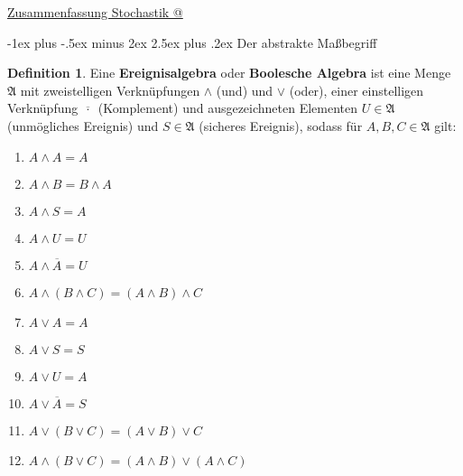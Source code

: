 \documentclass[a4paper,10pt,landscape]{article}
\makeatletter
\theoremstyle{definition}
\newtheorem*{defn}{Definition}
\theoremstyle{remark}
\newcommand*{\rom}[1]{\expandafter\@slowromancap\romannumeral #1@}
\renewcommand{\emph}[1]{\textcolor{Emph}{\bf{#1}}}
\renewcommand{\section}{\@startsection{section}{1}{0mm}%
                                {-1ex plus -.5ex minus 2ex}%
                                {2.5ex plus .2ex}%
                                {\normalfont\large\bfseries}}
\makeatother
\begin{document}
\raggedright
\footnotesize
\begin{multicols}{3}

\setlength{\premulticols}{1pt}
\setlength{\postmulticols}{1pt}
\setlength{\multicolsep}{1pt}
\setlength{\columnsep}{2pt}

\begin{center}
  \Large{\underline{Zusammenfassung Stochastik \rom{1}}} \\
\end{center}

\section{Der abstrakte Maßbegriff}


\begin{defn}
  Eine \emph{Ereignisalgebra} oder \emph{Boolesche Algebra} ist eine Menge $\mathfrak{A}$ mit zweistelligen Verknüpfungen $\wedge$ (\glqq und\grqq) und $\vee$ (\glqq oder\grqq), einer einstelligen Verknüpfung $\overline{\,\cdot\,}$ (Komplement) und ausgezeichneten Elementen $U \in \mathfrak{A}$ (unmögliches Ereignis) und $S \in \mathfrak{A}$ (sicheres Ereignis), sodass für $A, B, C \in \mathfrak{A}$ gilt:

  \begin{multicols}{2}
    \scriptsize
    \begin{enumerate}[label=\roman*.,leftmargin=2em]
      \item $A \wedge A = A$
      \item $A \wedge B = B \wedge A$
      \item $A \wedge S = A$
      \item $A \wedge U = U$
      \item $A \wedge \overline{A} = U$
      \item $A \wedge (B \wedge C) = (A \wedge B) \wedge C$
      \item $A \vee A = A$
      \item $A \vee S = S$
      \item $A \vee U = A$
      \item $A \vee \overline{A} = S$
      \item $A \vee (B \vee C) = (A \vee B) \vee C$
      \item $A \wedge (B \vee C) = (A \wedge B) \vee (A \wedge C)$
    \end{enumerate}
  \end{multicols}
\end{defn}


\end{multicols}
\end{document}

